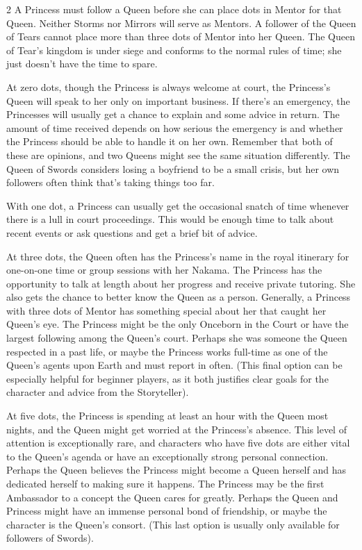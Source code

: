 \begin{multicols}{2}
A Princess must follow a Queen before she can place dots in Mentor for that Queen. Neither Storms nor Mirrors will serve as Mentors. A follower of the Queen of Tears cannot place more than three dots of Mentor into her Queen. The Queen of Tear's kingdom is under siege and conforms to the normal rules of time; she just doesn't have the time to spare.

At zero dots, though the Princess is always welcome at court, the Princess's Queen will speak to her only on important business. If there's an emergency, the Princesses will usually get a chance to explain and some advice in return. The amount of time received depends on how serious the emergency is and whether the Princess should be able to handle it on her own. Remember that both of these are opinions, and two Queens might see the same situation differently. The Queen of Swords considers losing a boyfriend to be a small crisis, but her own followers often think that's taking things too far.

With one dot, a Princess can usually get the occasional snatch of time whenever there is a lull in court proceedings. This would be enough time to talk about recent events or ask questions and get a brief bit of advice.

At three dots, the Queen often has the Princess's name in the royal itinerary for one-on-one time or group sessions with her Nakama. The Princess has the opportunity to talk at length about her progress and receive private tutoring. She also gets the chance to better know the Queen as a person. Generally, a Princess with three dots of Mentor has something special about her that caught her Queen's eye. The Princess might be the only Onceborn in the Court or have the largest following among the Queen's court. Perhaps she was someone the Queen respected in a past life, or maybe the Princess works full-time as one of the Queen's agents upon Earth and must report in often. (This final option can be especially helpful for beginner players, as it both justifies clear goals for the character and advice from the Storyteller).

At five dots, the Princess is spending at least an hour with the Queen most nights, and the Queen might get worried at the Princess's absence. This level of attention is exceptionally rare, and characters who have five dots are either vital to the Queen's agenda or have an exceptionally strong personal connection. Perhaps the Queen believes the Princess might become a Queen herself and has dedicated herself to making sure it happens. The Princess may be the first Ambassador to a concept the Queen cares for greatly. Perhaps the Queen and Princess might have an immense personal bond of friendship, or maybe the character is the Queen's consort. (This last option is usually only available for followers of Swords).


\end{multicols}
